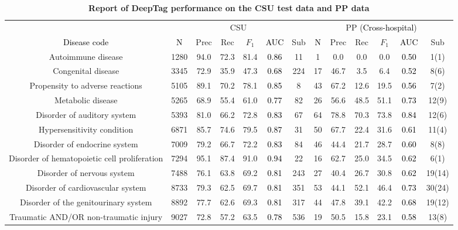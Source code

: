 \documentclass[fleqn,10pt]{wlscirep}
\newcommand{\edit}[1]{\textcolor{black}{#1}}
\newcommand{\newedit}[1]{\textcolor{black}{#1}}
\begin{document}
\begin{table}[h]
\centering
\footnotesize
\begin{adjustwidth}{-0.5in}{0in}
\caption{\textbf{Report of DeepTag performance on the CSU test data and PP data}}
\begin{tabular}{c | c c c c c c | c c c c c c }
\toprule
 & \multicolumn{6}{c|}{CSU} & \multicolumn{6}{c}{PP (\edit{Cross-hospital})}  \\
\newedit{Disease code} & \edit{N} & Prec & Rec & $F_1$ & \newedit{AUC} & Sub & \edit{N} & Prec & Rec & $F_1$ & \newedit{AUC}  & Sub \\
\midrule
Autoimmune disease  & 1280 & 94.0 & 72.3 & 81.4 & \newedit{0.86} & 11 & 1 & 0.0 & 0.0 & 0.0 & \newedit{0.50} & 1(1) \\ 
Congenital disease  & 3345 & 72.9 & 35.9 & 47.3 & \newedit{0.68} & 224 & 17 & 46.7 & 3.5 & 6.4 & \newedit{0.52} & 8(6) \\ 
Propensity to adverse reactions  & 5105 & 89.1 & 70.2 & 78.1 & \newedit{0.85} & 8 & 43 & 67.2 & 12.6 & 19.5 & \newedit{0.56} & 7(2) \\ 
Metabolic disease  & 5265 & 68.9 & 55.4 & 61.0 & \newedit{0.77} & 82 & 26 & 56.6 & 48.5 & 51.1 & \newedit{0.73} & 12(9) \\ 
Disorder of auditory system  & 5393 & 81.0 & 66.2 & 72.8 & \newedit{0.83} & 67 & 64 & 78.8 & 70.3 & 73.8 & \newedit{0.84} & 12(6) \\ 
Hypersensitivity condition  & 6871 & 85.7 & 74.6 & 79.5 & \newedit{0.87} & 31 & 50 & 67.7 & 22.4 & 31.6 & \newedit{0.61} & 11(4) \\ 
Disorder of endocrine system  & 7009 & 79.2 & 66.7 & 72.2 & \newedit{0.83} & 84 & 46 & 44.4 & 21.7 & 28.7 & \newedit{0.60} & 8(8) \\ 
Disorder of hematopoietic cell proliferation  & 7294 & 95.1 & 87.4 & 91.0 & \newedit{0.94} & 22 & 16 & 62.7 & 25.0 & 34.5 & \newedit{0.62} & 6(1) \\ 
Disorder of nervous system  & 7488 & 76.1 & 63.8 & 69.2 & \newedit{0.81} & 243 & 27 & 40.4 & 26.7 & 30.8 & \newedit{0.62} & 19(14) \\ 
Disorder of cardiovascular system  & 8733 & 79.3 & 62.5 & 69.7 & \newedit{0.81} & 351 & 53 & 44.1 & 52.1 & 46.4 & \newedit{0.73} & 30(24) \\ 
Disorder of the genitourinary system  & 8892 & 77.7 & 62.6 & 69.3 & \newedit{0.81} & 317 & 44 & 47.8 & 39.1 & 42.2 & \newedit{0.68} & 19(12) \\ 
Traumatic AND/OR non-traumatic injury  & 9027 & 72.8 & 57.2 & 63.5 & \newedit{0.78} & 536 & 19 & 50.5 & 15.8 & 23.1 & \newedit{0.58} & 13(8) \\ 

\end{tabular}
\end{adjustwidth}
\end{table}
\end{document}
